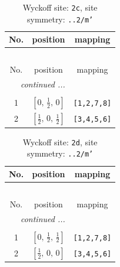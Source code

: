 \documentclass[fleqn,8pt]{jsarticle}
\begin{document}
\renewcommand{\arraystretch}{1.2}
\begin{longtable}{ccc}
\caption{Wyckoff site: {\tt 2c}, site symmetry: {\tt ..2/m'}}
 \\
 \hline \hline
No. & position & mapping \\ \hline \endfirsthead

\multicolumn{2}{l}{\tablename\ \thetable{}} \\
 \hline \hline
No. & position & mapping \\ \hline \endhead

 \hline \hline
\multicolumn{2}{r}{\footnotesize\it continued ...} \\ \endfoot

 \hline \hline
\multicolumn{2}{r}{} \\ \endlastfoot

1 & $\left[ 0,\, \frac{1}{2},\, 0 \right]$ & {\tt [1,2,7,8]} \\ \hline
2 & $\left[ \frac{1}{2},\, 0,\, \frac{1}{2} \right]$ & {\tt [3,4,5,6]} \\
\end{longtable}
\renewcommand{\arraystretch}{1.2}
\begin{longtable}{ccc}
\caption{Wyckoff site: {\tt 2d}, site symmetry: {\tt ..2/m'}}
 \\
 \hline \hline
No. & position & mapping \\ \hline \endfirsthead

\multicolumn{2}{l}{\tablename\ \thetable{}} \\
 \hline \hline
No. & position & mapping \\ \hline \endhead

 \hline \hline
\multicolumn{2}{r}{\footnotesize\it continued ...} \\ \endfoot

 \hline \hline
\multicolumn{2}{r}{} \\ \endlastfoot

1 & $\left[ 0,\, \frac{1}{2},\, \frac{1}{2} \right]$ & {\tt [1,2,7,8]} \\ \hline
2 & $\left[ \frac{1}{2},\, 0,\, 0 \right]$ & {\tt [3,4,5,6]} \\
\end{longtable}
\renewcommand{\arraystretch}{1.2}
\end{document}
